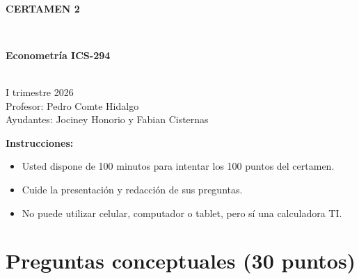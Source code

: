 \documentclass[10pt,a4paper]{article}
\begin{document}
\vspace{5cm}



\begin{center}
\begin{large}
\textbf{\\CERTAMEN 2}
\end{large}\\
\end{center}

\begin{center}
\begin{large}
\textbf{Econometría ICS-294}
\end{large}\\
\vspace{0.2cm}
I trimestre 2026\\
Profesor: Pedro Comte Hidalgo\\
Ayudantes: Jociney Honorio y Fabian Cisternas
\end{center}

\textbf{Instrucciones:} 

\begin{itemize}

    \item Usted dispone de 100 minutos  para intentar los 100 puntos del certamen.
    \item Cuide la presentación y redacción de sus preguntas.
    \item No puede utilizar celular, computador o tablet, pero sí una calculadora TI.
     
\end{itemize}

\section{Preguntas conceptuales (30 puntos)}
\end{document}

